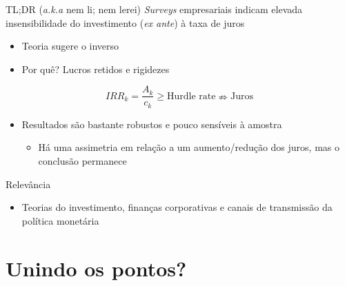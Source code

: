 \documentclass[presentation]{beamer}
\begin{document}
\begin{frame}[label={sec:org5546fb2}]{TL;DR (\emph{a.k.a} nem li; nem lerei)}
\emph{Surveys} empresariais indicam elevada insensibilidade do investimento (\emph{ex ante}) à taxa de juros
\begin{itemize}
\item Teoria sugere o inverso
\item Por quê? Lucros retidos e rigidezes
\end{itemize}

$$
IRR_{k} = \frac{A_{k}}{c_{k}} \geq \text{Hurdle rate} \nRightarrow \text{Juros}
$$

\begin{itemize}
\item Resultados são bastante robustos e pouco sensíveis à amostra
\begin{itemize}
\item Há uma assimetria em relação a um aumento/redução dos juros, mas o conclusão permanece
\end{itemize}
\end{itemize}

\begin{block}{Relevância}
\begin{itemize}
\item Teorias do investimento, finanças corporativas e canais de transmissão da política monetária
\end{itemize}
\end{block}
\end{frame}

\section{Unindo os pontos?}
\label{sec:org91ac82b}
\end{document}
